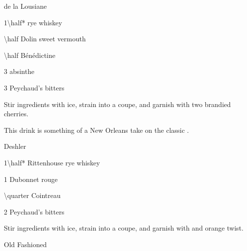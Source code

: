 \begin{PDTCocktail}{de la Lousiane}
	\begin{Ingredients}
	\item \SI{1\half*}{\oz} rye whiskey
	\item \SI{\half}{\oz} Dolin sweet vermouth
	\item \SI{\half}{\oz} B\'en\'edictine
	\item 3 \si{\dashes} absinthe
	\item 3 \si{\dashes} Peychaud's bitters
	\end{Ingredients}
	
	\begin{Instructions}
	Stir ingredients with ice, strain into a coupe, and garnish with two brandied cherries.
	
	This drink is something of a New Orleans take on the classic \InlineCocktail*{Manhattan}.
	\end{Instructions}
\end{PDTCocktail}

\begin{PDTCocktail}{Deshler}
	\begin{Ingredients}
	\item \SI{1\half*}{\oz} Rittenhouse rye whiskey
	\item \SI{1}{\oz} Dubonnet rouge
	\item \SI{\quarter}{\oz} Cointreau
	\item 2 \si{\dashes} Peychaud's bitters
	\end{Ingredients}
	
	\begin{Instructions}
	Stir ingredients with ice, strain into a coupe, and garnish with and orange twist.
	\end{Instructions}
\end{PDTCocktail}

\begin{AltCocktail}{Old Fashioned}
	\begin{Ingredients}
	\item
	\end{Ingredients}
	
	\begin{Instructions}
	
	\end{Instructions}
\end{AltCocktail}

